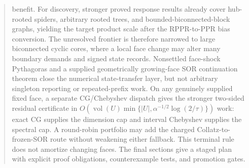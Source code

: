 \documentclass[11pt]{article}
\begin{document}
\begin{abstract}
benefit.
For discovery, stronger proved response results already cover hub-rooted spiders,
arbitrary rooted trees, and bounded-biconnected-block graphs, yielding the
target product scale after the RPPR-to-PPR bias conversion.  The unresolved
frontier is therefore narrowed to large biconnected cyclic cores, where a
local face change may alter many boundary demands and signed state records.
Nonsettled face-shock Pythagoras and a supplied geometrically growing-face
SOR continuation theorem close the numerical state-transfer layer, but not
arbitrary singleton reporting or repeated-prefix work.
On any genuinely supplied fixed face, a separate CG/Chebyshev dispatch gives
the stronger two-sided residual certificate in
$O(\operatorname{vol}(U)\min\{|U|,\alpha^{-1/2}\log(2/\tau)\})$ work:
exact CG supplies the dimension cap and interval Chebyshev supplies the
spectral cap.  A round-robin portfolio may add the charged
Collatz-to-frozen-SOR route without weakening either fallback.  This terminal
rule does not amortize changing faces.
The final sections give a staged plan with explicit proof obligations,
counterexample tests, and promotion gates.
\end{abstract}












\end{document}
